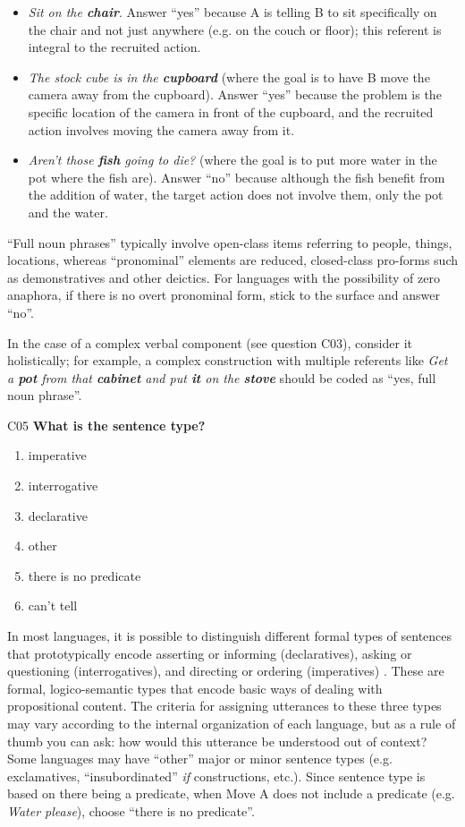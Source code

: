 \documentclass[output=paper]{langsci/langscibook}
\begin{document}
\begin{description}
\begin{itemize}
\item \textit{Sit on the \textbf{chair}}. Answer “yes” because A is telling B to sit specifically on the chair and not just anywhere (e.g. on the couch or floor); this referent is integral to the recruited action.
\item \textit{The stock cube is in the \textbf{cupboard}} (where the goal is to have B move the camera away from the cupboard). Answer “yes” because the problem is the specific location of the camera in front of the cupboard, and the recruited action involves moving the camera away from it.
\item \textit{Aren’t those \textbf{fish} going to die?} (where the goal is to put more water in the pot where the fish are). Answer “no” because although the fish benefit from the addition of water, the target action does not involve them, only the pot and the water.
\end{itemize}

“Full noun phrases” typically involve open-class items referring to people, things, locations, whereas “pronominal” elements are reduced, closed-class pro-forms such as demonstratives and other deictics. For languages with the possibility of zero anaphora, if there is no overt pronominal form, stick to the surface and answer “no”.

In the case of a complex verbal component (see question C03), consider it holistically; for example, a complex construction with multiple referents like \textit{Get a \textbf{pot} from that \textbf{cabinet} and put \textbf{it} on the \textbf{stove}} should be coded as “yes, full noun phrase”.

\item
C05  \textbf{What is the sentence type?}
\begin{enumerate}
\item
imperative
\item
interrogative
\item
declarative
\item
other
\item
there is no predicate
\item
can’t tell
\end{enumerate}

In most languages, it is possible to distinguish different formal types of sentences that prototypically encode asserting or informing (declaratives), asking or questioning (interrogatives), and directing or ordering (imperatives) \citep{Lyons1977,SadockZwicky1985,KönigSiemund2007}. These are formal, logico-semantic types that encode basic ways of dealing with propositional content. The criteria for assigning utterances to these three types may vary according to the internal organization of each language, but as a rule of thumb you can ask: how would this utterance be understood out of context? Some languages may have “other” major or minor sentence types (e.g. exclamatives, “insubordinated” \textit{if} constructions, etc.). Since sentence type is based on there being a predicate, when Move A does not include a predicate (e.g. \textit{Water please}), choose “there is no predicate”.


\end{description}
\end{document}
